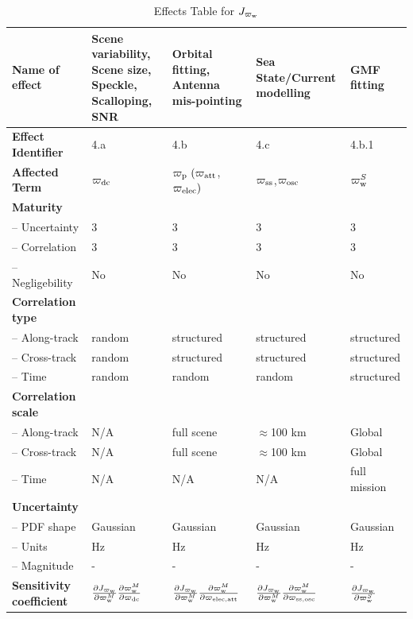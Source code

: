 \begin{table}[h]
		\centering
		\scriptsize %
		\setlength{\tabcolsep}{2pt} %
		\caption{Effects Table for $J_{\varpi_{\rm w}}$}
		
		\begin{tabularx}{\textwidth}{l | X | X | X | X}
			\toprule
			\textbf{Name of effect} & Scene variability, Scene size, Speckle, Scalloping, SNR & Orbital fitting, Antenna mis-pointing & Sea State/Current modelling & GMF fitting \\
			\midrule
			\textbf{Effect Identifier} & 4.a & 4.b & 4.c & 4.b.1 \\
			\midrule
			\textbf{Affected Term} & $\varpi_{\rm dc}$ & $\varpi_{\rm p} \ (\varpi_{\rm att}$,$\varpi_{\rm elec})$ & $\varpi_{\rm ss}$,$\varpi_{\rm osc}$ & $\varpi_{\rm w}^{S}$ \\
			\midrule
			\textbf{Maturity} &  &  &  &  \\
			\quad -- Uncertainty & 3 & 3 & 3 & 3 \\
			\quad -- Correlation & 3 & 3 & 3 & 3 \\
			\quad -- Negligebility & No & No & No & No \\
			\midrule
			\textbf{Correlation type} &  &  &  &  \\
			\quad -- Along-track & random & structured & structured & structured \\
			\quad -- Cross-track & random & structured & structured & structured \\
			\quad -- Time & random & random & random & structured \\
			\midrule
			\textbf{Correlation scale} &  &  &  &  \\
			\quad -- Along-track & N/A & full scene & $\approx$100 km & Global \\
			\quad -- Cross-track & N/A & full scene & $\approx$100 km & Global \\
			\quad -- Time & N/A & N/A & N/A & full mission \\
			\midrule
			\textbf{Uncertainty} & & & & \\
			\quad -- PDF shape & Gaussian & Gaussian & Gaussian & Gaussian \\
			\quad -- Units & Hz & Hz & Hz & Hz \\
			\quad -- Magnitude & - & - & - & - \\
			\midrule
			\textbf{Sensitivity coefficient} & $\frac{\partial J_{\varpi_{\rm w}}}{\partial \varpi_{\rm w}^{M}} \frac{\partial \varpi_{\rm w}^{M}}{\partial \varpi_{\rm dc}}$ & $\frac{\partial J_{\varpi_{\rm w}}}{\partial \varpi_{\rm w}^{M}} \frac{\partial \varpi_{\rm w}^{M}}{\partial \varpi_{\rm elec,att}}$ & $\frac{\partial J_{\varpi_{\rm w}}}{\partial \varpi_{\rm w}^{M}} \frac{\partial \varpi_{\rm w}^{M}}{\partial \varpi_{\rm ss,osc}}$ & $\frac{\partial J_{\varpi_{\rm w}}}{\partial \varpi_{\rm w}^{S}}$ \\
			\bottomrule
		\end{tabularx}
        \label{tab: effects Jfw}
	\end{table}


